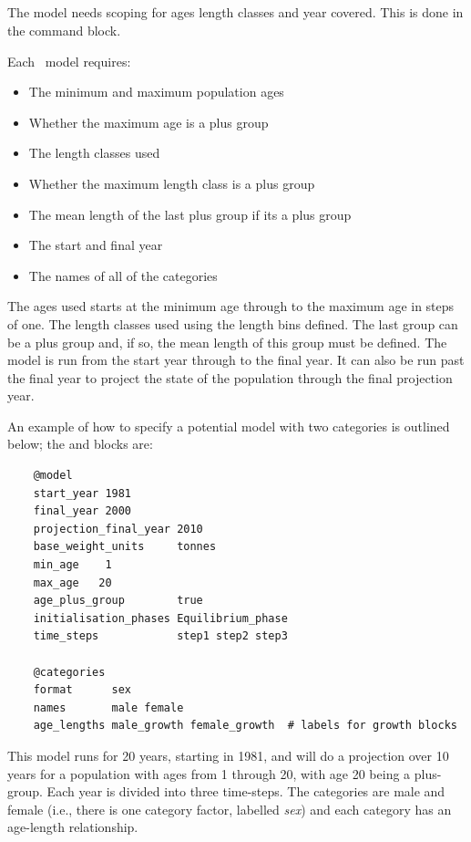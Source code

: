 \subsection{}\label{sec:Model}

The model needs scoping for \ifAgeBased ages \else length classes \fi  and year covered. This is done in the  command block.

Each \CNAME\ model requires:

\begin{itemize}
\ifAgeBased
\item The minimum and maximum population ages
\item Whether the maximum age is a plus group
\else 
\item The length classes used
\item Whether the maximum length class is a plus group
\item The mean length of the last plus group if its a plus group
\fi
\item The start and final year
\item The names of all of the categories
\end{itemize}

\ifAgeBased The ages used starts at the minimum age through to the maximum age in steps of one. \else The length classes used using the length bins defined. The last group can be a plus group and, if so, the mean length of this group must be defined. \fi The model is run from the start year through to the final year. It can also be run past the final year to project the state of the population through the final projection year.

An example of how to specify a potential model with two categories is outlined below;  the  and  blocks are:

\ifAgeBased 
{\small{\begin{verbatim}
	@model
	start_year 1981
	final_year 2000
	projection_final_year 2010
	base_weight_units     tonnes
	min_age    1
	max_age   20
	age_plus_group        true
	initialisation_phases Equilibrium_phase
	time_steps            step1 step2 step3

	@categories
	format      sex
	names       male female
	age_lengths male_growth female_growth  # labels for growth blocks
\end{verbatim}}}

This model runs for 20 years, starting in 1981, and will do a projection over 10 years for a population with ages from  1 through 20, with age 20 being a plus-group. Each year is divided into three time-steps. The categories are male and female (i.e., there is one category factor, labelled \textit{sex}) and each category has an age-length relationship.

